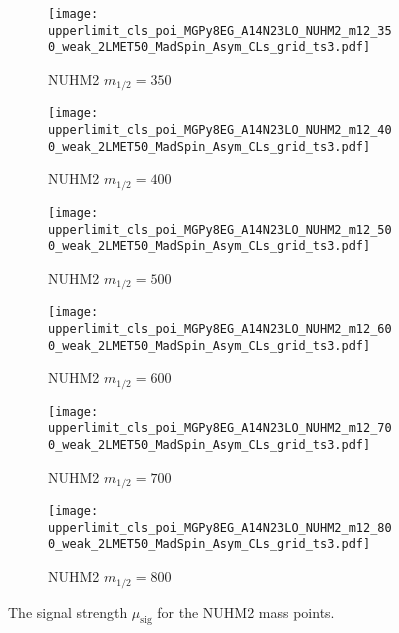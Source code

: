 \begin{figure}[htbp]
    \begin{center}
        \begin{subfigure}[b]{0.48\textwidth}
            \texttt{[image: upperlimit\_cls\_poi\_MGPy8EG\_A14N23LO\_NUHM2\_m12\_350\_weak\_2LMET50\_MadSpin\_Asym\_CLs\_grid\_ts3.pdf]}
            \caption{NUHM2 $m_{1/2} = 350$~{\GeV}}
        \end{subfigure}
        \begin{subfigure}[b]{0.48\textwidth}
            \texttt{[image: upperlimit\_cls\_poi\_MGPy8EG\_A14N23LO\_NUHM2\_m12\_400\_weak\_2LMET50\_MadSpin\_Asym\_CLs\_grid\_ts3.pdf]}
            \caption{NUHM2 $m_{1/2} = 400$~{\GeV}}
        \end{subfigure}
        \begin{subfigure}[b]{0.48\textwidth}
            \texttt{[image: upperlimit\_cls\_poi\_MGPy8EG\_A14N23LO\_NUHM2\_m12\_500\_weak\_2LMET50\_MadSpin\_Asym\_CLs\_grid\_ts3.pdf]}
            \caption{NUHM2 $m_{1/2} = 500$~{\GeV}}
        \end{subfigure}
        \begin{subfigure}[b]{0.48\textwidth}
            \texttt{[image: upperlimit\_cls\_poi\_MGPy8EG\_A14N23LO\_NUHM2\_m12\_600\_weak\_2LMET50\_MadSpin\_Asym\_CLs\_grid\_ts3.pdf]}
            \caption{NUHM2 $m_{1/2} = 600$~{\GeV}}
        \end{subfigure}
        \begin{subfigure}[b]{0.48\textwidth}
            \texttt{[image: upperlimit\_cls\_poi\_MGPy8EG\_A14N23LO\_NUHM2\_m12\_700\_weak\_2LMET50\_MadSpin\_Asym\_CLs\_grid\_ts3.pdf]}
            \caption{NUHM2 $m_{1/2} = 700$~{\GeV}}
        \end{subfigure}
        \begin{subfigure}[b]{0.48\textwidth}
            \texttt{[image: upperlimit\_cls\_poi\_MGPy8EG\_A14N23LO\_NUHM2\_m12\_800\_weak\_2LMET50\_MadSpin\_Asym\_CLs\_grid\_ts3.pdf]}
            \caption{NUHM2 $m_{1/2} = 800$~{\GeV}}
        \end{subfigure}
    \end{center}
    \caption{The signal strength $\mu_\mathrm{sig}$ for the NUHM2 mass points.}
    \label{fig:results_nuhm2_signal_strength}
\end{figure}

